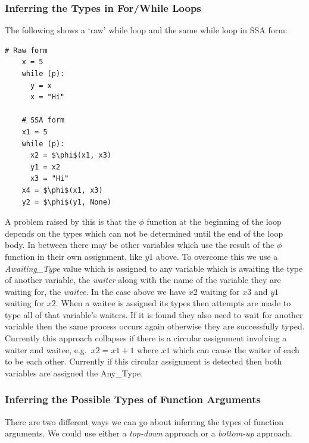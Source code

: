 \documentclass[12pt, titlepage]{article}
\begin{document}
\subsubsection{Inferring the Types in For/While Loops}
The following shows a `raw' while loop and the same while loop in SSA form:
\begin{lstlisting}[mathescape]
    # Raw form
    x = 5
    while (p):
      y = x
      x = "Hi"
	
    # SSA form
    x1 = 5
    while (p):
      x2 = $\phi$(x1, x3)
      y1 = x2
      x3 = "Hi"
    x4 = $\phi$(x1, x3)
    y2 = $\phi$(y1, None)
\end{lstlisting}
A problem raised by this is that the $\phi$ function at the beginning of the loop depends on the types which can not be determined until the end of the loop body. In between there may be other variables which use the result of the $\phi$ function in their own assignment, like $y1$ above. To overcome this we use a \textit{Awaiting\_Type} value which is assigned to any variable which is awaiting the type of another variable, the \textit{waiter} along with the name of the variable they are waiting for, the \textit{waitee}. In the case above we have $x2$ waiting for $x3$ and $y1$ waiting for $x2$. When a waitee is assigned its types then attempts are made to type all of that variable's waiters. If it is found they also need to wait for another variable then the same process occurs again otherwise they are successfully typed. Currently this approach collapses if there is a circular assignment involving a waiter and waitee, e.g.\ $x2 = x1 + 1$ where $x1$ which can cause the waiter of each to be each other. Currently if this circular assignment is detected then both variables are assigned the Any\_Type.


\subsubsection{Inferring the Possible Types of Function Arguments}
There are two different ways we can go about inferring the types of function arguments. We could use either a \textit{top-down} approach or a \textit{bottom-up} approach.
\end{document}
